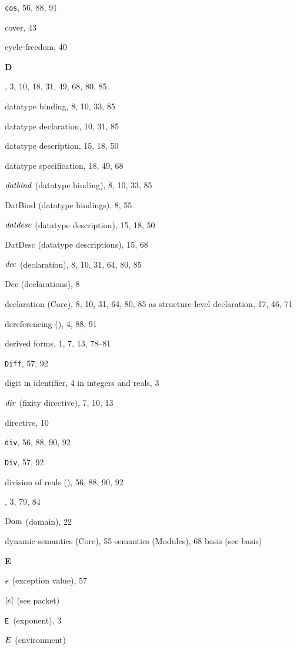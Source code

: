 \begin{theindex}
\item {\tt cos}, 56, 88, 91
\item cover, 43
\item cycle-freedom, 40
\indexspace
\parbox{65mm}{\hfil{\large\bf D}\hfil}
\indexspace
\item \DATATYPE, 3, 10, 18, 31, 49, 68, 80, 85
\item datatype binding, 8, 10, 33, 85
\item datatype declaration, 10, 31, 85
\item datatype description, 15, 18, 50
\item datatype specification, 18, 49, 68
\item ${\it datbind}$ (datatype binding), 8, 10, 33, 85
\item DatBind (datatype bindings), 8, 55
\item ${\it datdesc}$ (datatype description), 15, 18, 50
\item DatDesc (datatype descriptions), 15, 68
\item ${\it dec}$ (declaration), 8, 10, 31, 64, 80, 85
\item Dec (declarations), 8
\item declaration (Core), 8, 10, 31, 64, 80, 85
\subitem as structure-level declaration, 17, 46, 71
\item dereferencing (\ml{!}), 4, 88, 91
\item derived forms, 1, 7, 13, 78--81
\item {\tt Diff}, 57, 92
\item digit 
\subitem in identifier, 4
\subitem in integers and reals, 3
\item ${\it dir}$ (fixity directive), 7, 10, 13
\item directive, 10
\item {\tt div}, 56, 88, 90, 92
\item {\tt Div}, 57, 92
\item division of reals (\ml{/}), 56, 88, 90, 92
\item \DO, 3, 79, 84
\item $\mathop{\rm Dom}\nolimits$ (domain), 22
\item dynamic 
\subitem semantics (Core), 55
\subitem semantics (Modules), 68
\subitem basis (see basis) 
\indexspace
\parbox{65mm}{\hfil{\large\bf E}\hfil}
\indexspace
\item $e$ (exception value), 57
\item $[e]$ (see packet) 
\item \verb+E+\ (exponent), 3
\item $E$ (environment) 

\end{theindex}
